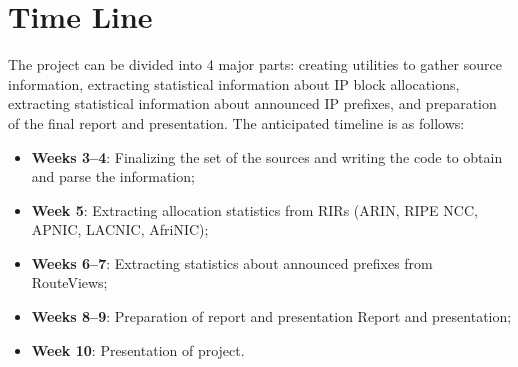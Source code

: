 \documentclass[conference]{IEEEtran}
\begin{document}
\section{Time Line}

The project can be divided into 4 major parts: creating utilities to gather source information, extracting statistical information about IP block allocations, extracting statistical information about announced IP prefixes, and preparation of the final report and presentation. The anticipated timeline is as follows:

\begin{itemize}
\item \textbf{Weeks 3--4}: Finalizing the set of the sources and writing the code to obtain and parse the information;
\item \textbf{Week 5}: Extracting allocation statistics from RIRs (ARIN, RIPE NCC, APNIC, LACNIC, AfriNIC);
\item \textbf{Weeks 6--7}: Extracting statistics about announced prefixes from RouteViews;
\item \textbf{Weeks 8--9}: Preparation of report and presentation Report and presentation;
\item \textbf{Week 10}: Presentation of project.
\end{itemize}




\end{document}
